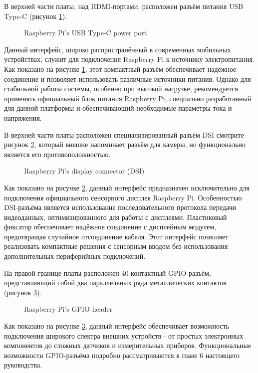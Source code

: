 В верхней части платы, над HDMI-портами, расположен разъём питания USB Type-C (рисунок \ref{fig:typeC}).

\begin{figure}[H]
	\centering
	\caption{Raspberry Pi’s USB Type-C power port}
	\label{fig:typeC}
\end{figure}

Данный интерфейс, широко распространённый в современных мобильных устройствах, служит для подключения Raspberry Pi к источнику электропитания. Как показано на рисунке \ref{fig:typeC}, этот компактный разъём обеспечивает надёжное соединение и позволяет использовать различные источники питания. Однако для стабильной работы системы, особенно при высокой нагрузке, рекомендуется применять официальный блок питания Raspberry Pi, специально разработанный для данной платформы и обеспечивающий необходимые параметры тока и напряжения.


В верхней части платы расположен специализированный разъём DSI смотрите рисунок \ref{fig:display}, который внешне напоминает разъём для камеры, но функционально является его противоположностью.

\begin{figure}[H]
	\centering
	\caption{Raspberry Pi’s display connector (DSI)}
	\label{fig:display}
\end{figure}

Как показано на рисунке \ref{fig:display}, данный интерфейс предназначен исключительно для подключения официального сенсорного дисплея Raspberry Pi. Особенностью DSI-разъёма является использование последовательного протокола передачи видеоданных, оптимизированного для работы с дисплеями. Пластиковый фиксатор обеспечивает надёжное соединение с дисплейным модулем, предотвращая случайное отсоединение кабеля. Этот интерфейс позволяет реализовать компактные решения с сенсорным вводом без использования дополнительных периферийных подключений.

На правой границе платы расположен 40-контактный GPIO-разъём, представляющий собой два параллельных ряда металлических контактов (рисунок \ref{fig:gpio}).

\begin{figure}[H]
	\centering
	\caption{Raspberry Pi’s GPIO header}
	\label{fig:gpio}
\end{figure}

Как показано на рисунке \ref{fig:gpio}, данный интерфейс обеспечивает возможность подключения широкого спектра внешних устройств - от простых электронных компонентов  до сложных датчиков и измерительных приборов. Функциональные возможности GPIO-разъёма подробно рассматриваются в главе 6 настоящего руководства.

